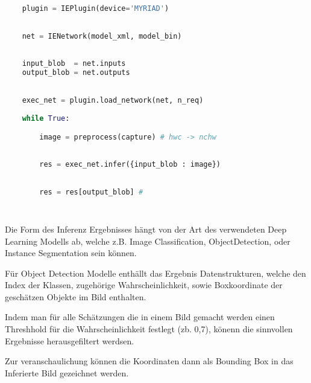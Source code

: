 \begin{minipage}{0.30\textwidth}
    \centering
    
    \label{fig:inger_engine_workflow}
\end{minipage}
\begin{minipage}{0.70\textwidth}

\begin{lstlisting}[language=Python]

    plugin = IEPlugin(device='MYRIAD')

        
    net = IENetwork(model_xml, model_bin)
        
    
    input_blob  = net.inputs
    output_blob = net.outputs
        

    exec_net = plugin.load_network(net, n_req)
        
    while True:

        image = preprocess(capture) # hwc -> nchw
        
        
        res = exec_net.infer({input_blob : image})
        

        res = res[output_blob] #
        
        
\end{lstlisting}
\vspace{1.5cm}
\end{minipage}


Die Form des Inferenz Ergebnisses hängt von der 
Art des verwendeten Deep Learning Modells ab, welche 
z.B. Image Classification, ObjectDetection, oder Instance
Segmentation sein können.

Für Object Detection Modelle enthällt das Ergebnis Datenstrukturen, 
welche den Index der Klassen, zugehörige Wahrscheinlichkeit, 
sowie Boxkoordinate der geschätzen Objekte im Bild enthalten.

Indem man für alle Schätzungen die in einem Bild gemacht werden 
einen Threshhold für die Wahrscheinlichkeit festlegt (zb. 0,7),
könenn die sinnvollen Ergebnisse herausgefiltert werdsen.

Zur veranschaulichung können die Koordinaten dann 
als Bounding Box in das Inferierte Bild gezeichnet werden.
